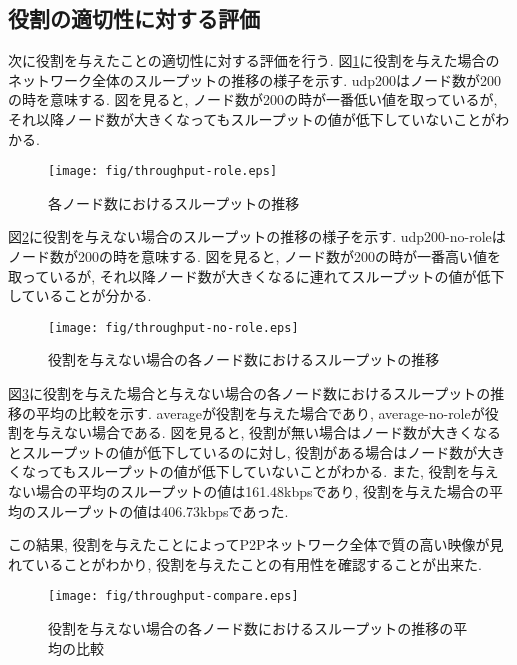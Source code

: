 \subsection{役割の適切性に対する評価}
次に役割を与えたことの適切性に対する評価を行う. 図\ref{fig:throughput-role}に役割を与えた場合のネットワーク全体のスループットの推移の様子を示す. udp200はノード数が200の時を意味する. 図を見ると, ノード数が200の時が一番低い値を取っているが, それ以降ノード数が大きくなってもスループットの値が低下していないことがわかる.

\begin{figure}[h]
  \centering
  \texttt{[image: fig/throughput-role.eps]}
  \caption{各ノード数におけるスループットの推移}
  \label{fig:throughput-role}
\end{figure}

\newpage

図\ref{fig:throughput-no-role}に役割を与えない場合のスループットの推移の様子を示す. udp200-no-roleはノード数が200の時を意味する. 図を見ると, ノード数が200の時が一番高い値を取っているが, それ以降ノード数が大きくなるに連れてスループットの値が低下していることが分かる.

\begin{figure}[h]
  \centering
  \texttt{[image: fig/throughput-no-role.eps]}
  \caption{役割を与えない場合の各ノード数におけるスループットの推移}
  \label{fig:throughput-no-role}
\end{figure}

\newpage

図\ref{fig:throughput-compare}に役割を与えた場合と与えない場合の各ノード数におけるスループットの推移の平均の比較を示す. averageが役割を与えた場合であり, average-no-roleが役割を与えない場合である. 図を見ると, 役割が無い場合はノード数が大きくなるとスループットの値が低下しているのに対し, 役割がある場合はノード数が大きくなってもスループットの値が低下していないことがわかる. また, 役割を与えない場合の平均のスループットの値は161.48kbpsであり, 役割を与えた場合の平均のスループットの値は406.73kbpsであった.

この結果, 役割を与えたことによってP2Pネットワーク全体で質の高い映像が見れていることがわかり, 役割を与えたことの有用性を確認することが出来た.

\begin{figure}[h]
  \centering
  \texttt{[image: fig/throughput-compare.eps]}
  \caption{役割を与えない場合の各ノード数におけるスループットの推移の平均の比較}
  \label{fig:throughput-compare}
\end{figure}

